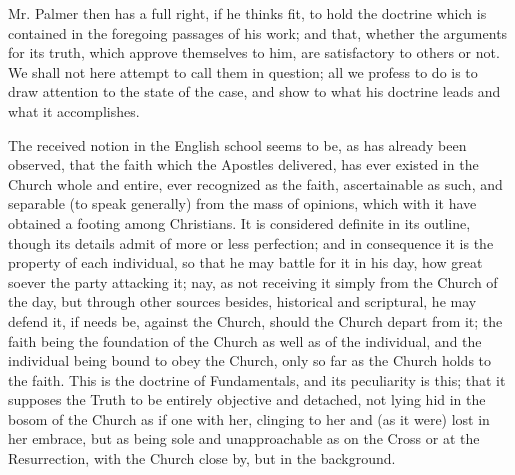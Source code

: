 Mr. Palmer then has a full right, if he thinks
fit, to hold the doctrine which is contained in the foregoing passages
of his work; and that, whether the arguments for its truth, which
approve themselves to him, are satisfactory to others or not. We shall
not here attempt to call them in question; all we profess to do is to
draw attention to the state of the case, and show to what his doctrine
leads and what it accomplishes.

The received notion in the English school seems
to be, as has already been observed, that the faith which the Apostles
delivered, has ever existed in the Church whole and entire, ever
recognized as the faith, ascertainable as such, and separable (to
speak generally) from the mass of opinions, which with it have
obtained a footing among Christians. It is considered definite in its
outline, though its details admit of more or less perfection; and in
consequence it is the property of each individual, so that he may
battle for it in his day, how great soever the party attacking it;
nay, as not receiving it simply from the Church of the day, but
through other sources besides, historical and scriptural, he may
defend it, if needs be, against the Church, should the Church depart
from it; the faith being the foundation of the Church as well as of
the individual, and the individual being bound to obey the Church,
only so far as the Church holds to the faith. This is the doctrine of
Fundamentals, and its peculiarity is this; that it supposes the Truth
to be entirely objective and detached, not lying hid in the
bosom of the Church as if one with her, clinging to her and (as it
were) lost in her embrace, but as being sole and unapproachable as on
the Cross or at the Resurrection, with the Church close by, but in the
background.

